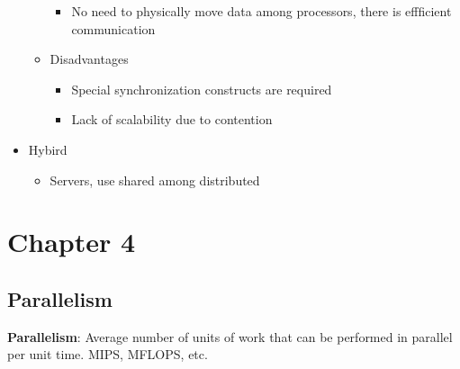 \documentclass{article}
\begin{document}
\begin{itemize}
\begin{itemize}
\begin{itemize}
                        \item No need to physically move data among processors, there is effficient communication
                    \end{itemize}
              \item Disadvantages
                    \begin{itemize}
                        \item Special synchronization constructs are required
                        \item Lack of scalability due to contention
                    \end{itemize}
          \end{itemize}
    \item Hybird
          \begin{itemize}
              \item Servers, use shared among distributed
          \end{itemize}
\end{itemize}

\section{Chapter 4}
\subsection{Parallelism}
\textbf{Parallelism}: Average number of units of work that can be performed in parallel per unit time. MIPS, MFLOPS, etc.
\end{document}
